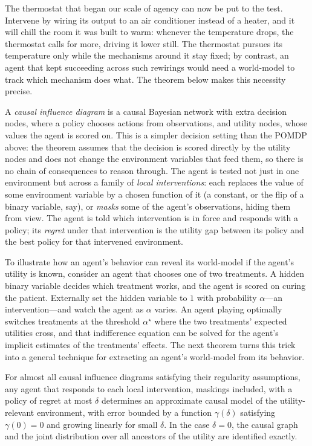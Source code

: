 The thermostat that began our scale of agency can now be put to the test. Intervene by wiring its output to an air conditioner instead of a heater, and it will chill the room it was built to warm: whenever the temperature drops, the thermostat calls for more, driving it lower still. The thermostat pursues its temperature only while the mechanisms around it stay fixed; by contrast, an agent that kept succeeding across such rewirings would need a world-model to track which mechanism does what. The theorem below makes this necessity precise.

A \emph{causal influence diagram} is a causal Bayesian network with extra decision nodes, where a policy chooses actions from observations, and utility nodes, whose values the agent is scored on. This is a simpler decision setting than the POMDP above: the theorem assumes that the decision is scored directly by the utility nodes and does not change the environment variables that feed them, so there is no chain of consequences to reason through. The agent is tested not just in one environment but across a family of \emph{local interventions}: each replaces the value of some environment variable by a chosen function of it (a constant, or the flip of a binary variable, say), or \emph{masks} some of the agent's observations, hiding them from view. The agent is told which intervention is in force and responds with a policy; its \emph{regret} under that intervention is the utility gap between its policy and the best policy for that intervened environment.

To illustrate how an agent's behavior can reveal its world-model if the agent's utility is known, consider an agent that chooses one of two treatments. A hidden binary variable decides which treatment works, and the agent is scored on curing the patient. Externally set the hidden variable to $1$ with probability $\alpha$---an intervention---and watch the agent as $\alpha$ varies. An agent playing optimally switches treatments at the threshold $\alpha^\star$ where the two treatments' expected utilities cross, and that indifference equation can be solved for the agent's implicit estimates of the treatments' effects. The next theorem turns this trick into a general technique for extracting an agent's world-model from its behavior.

\begin{theorem*}
For almost all causal influence diagrams satisfying their regularity assumptions, any agent that responds to each local intervention, maskings included, with a policy of regret at most $\delta$ determines an approximate causal model of the utility-relevant environment, with error bounded by a function $\gamma(\delta)$ satisfying $\gamma(0)=0$ and growing linearly for small $\delta$. In the case $\delta=0$, the causal graph and the joint distribution over all ancestors of the utility are identified exactly.
\end{theorem*}

